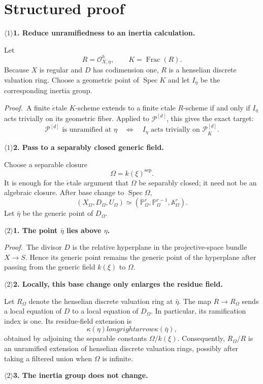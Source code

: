 \documentclass[11pt]{article}
\newcommand{\cP}{\mathcal P}
\newcommand{\Spec}{\operatorname{Spec}}
\newcommand{\step}[2]{\par\medskip\noindent
  \textcolor{heading}{\textbf{\(\langle #1\rangle\)#2}}\quad}
\newcommand{\pf}{\par\smallskip\noindent\textit{Proof.}\ }
\begin{document}
\section*{Structured proof}

\step{1}{1. Reduce unramifiedness to an inertia calculation.}

Let
\[
  R=\mathcal O^{h}_{X,\eta},\qquad K=\operatorname{Frac}(R).
\]
Because $X$ is regular and $D$ has codimension one, $R$ is a henselian
discrete valuation ring.  Choose a geometric point of $\Spec K$ and let
$I_\eta$ be the corresponding inertia group.

\pf A finite \(\acute{e}\)tale $K$-scheme extends to a finite
\(\acute{e}\)tale $R$-scheme if and only if $I_\eta$ acts trivially on its
geometric fiber.  Applied to $\cP^{[d]}$, this gives the exact target:
\[
  \cP^{[d]}\text{ is unramified at }\eta
  \quad\Longleftrightarrow\quad
  I_\eta\text{ acts trivially on }\cP^{[d]}_{\bar K}.
\]

\step{1}{2. Pass to a separably closed generic field.}

Choose a separable closure
\[
  \Omega=k(\xi)^{\mathrm{sep}}.
\]
It is enough for the \(\acute{e}\)tale argument that $\Omega$ be separably
closed; it need not be an algebraic closure.  After base change to
$\Spec\Omega$,
\[
  (X_\Omega,D_\Omega,U_\Omega)
  \simeq
  (\mathbb P^r_\Omega,\mathbb P^{r-1}_\Omega,\mathbb A^r_\Omega).
\]
Let $\bar\eta$ be the generic point of $D_\Omega$.

\step{2}{1. The point $\bar\eta$ lies above $\eta$.}

\pf The divisor $D$ is the relative hyperplane in the projective-space
bundle $X\to S$.  Hence its generic point remains the generic point of the
hyperplane after passing from the generic field $k(\xi)$ to $\Omega$.

\step{2}{2. Locally, this base change only enlarges the residue field.}

Let $R_\Omega$ denote the henselian discrete valuation ring at
$\bar\eta$.  The map $R\to R_\Omega$ sends a local equation of $D$ to a
local equation of $D_\Omega$.  In particular, its ramification index is
one.  Its residue-field extension is
\[
  \kappa(\eta)longrightarrow\kappa(\bar\eta),
\]
obtained by adjoining the separable constants $\Omega/k(\xi)$.
Consequently, $R_\Omega/R$ is an unramified extension of henselian discrete
valuation rings, possibly after taking a filtered union when $\Omega$ is
infinite.

\step{2}{3. The inertia group does not change.}
\end{document}
